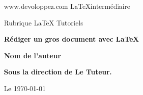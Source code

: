 \begin{titlepage}
\parindent=0pt

www.devoloppez.com  \LaTeX intermédiaire%

Rubrique \LaTeX{} Tutoriels


\hrulefill
\begin{center}\bfseries\Huge
    Rédiger un gros document avec \LaTeX
\end{center}
\hrulefill

\vspace*{1cm}
\begin{center}\bfseries\Large
Nom de l'auteur
\end{center}
    
\begin{center}\bfseries\Large
Sous la direction de Le Tuteur.
\end{center}



\begin{flushright}
       Le \today 
\end{flushright}   
\end{titlepage}

